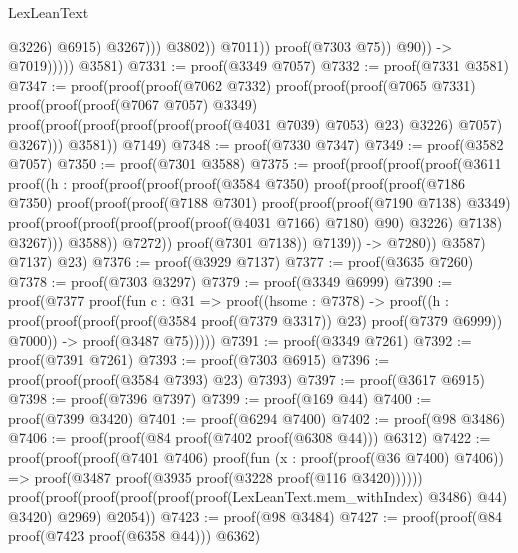 \begin{lexlean}{LexLeanText}
\begin{coremodule}
                                                @3226)
                                              @6915)
                                            @3267)))
                                  @3802))
                            @7011))
                      proof(@7303 @75))
                    @90)) ->
                @7019)))))
      @3581)
@7331 := proof(@3349 @7057)
@7332 := proof(@7331 @3581)
@7347 := proof(proof(proof(@7062 @7332)
        proof(proof(proof(@7065 @7331)
              proof(proof(proof(@7067 @7057) @3349)
                  proof(proof(proof(proof(proof(proof(@4031 @7039) @7053) @23) @3226) @7057)
                      @3267)))
            @3581))
      @7149)
@7348 := proof(@7330 @7347)
@7349 := proof(@3582 @7057)
@7350 := proof(@7301 @3588)
@7375 := proof(proof(proof(proof(@3611
            proof((h : proof(proof(proof(proof(@3584 @7350)
                      proof(proof(proof(@7186 @7350)
                            proof(proof(proof(@7188 @7301)
                                  proof(proof(proof(@7190 @7138) @3349)
                                      proof(proof(proof(proof(proof(proof(@4031 @7166) @7180) @90)
                                              @3226)
                                            @7138)
                                          @3267)))
                                @3588))
                          @7272))
                    proof(@7301 @7138))
                  @7139)) ->
              @7280))
          @3587)
        @7137)
      @23)
@7376 := proof(@3929 @7137)
@7377 := proof(@3635 @7260)
@7378 := proof(@7303 @3297)
@7379 := proof(@3349 @6999)
@7390 := proof(@7377
      proof(fun {c : @31} =>
        proof((hsome : @7378) ->
          proof((h : proof(proof(proof(proof(@3584 proof(@7379 @3317)) @23) proof(@7379 @6999))
                @7000)) ->
            proof(@3487 @75)))))
@7391 := proof(@3349 @7261)
@7392 := proof(@7391 @7261)
@7393 := proof(@7303 @6915)
@7396 := proof(proof(proof(@3584 @7393) @23) @7393)
@7397 := proof(@3617 @6915)
@7398 := proof(@7396 @7397)
@7399 := proof(@169 @44)
@7400 := proof(@7399 @3420)
@7401 := proof(@6294 @7400)
@7402 := proof(@98 @3486)
@7406 := proof(proof(@84 proof(@7402 proof(@6308 @44))) @6312)
@7422 := proof(proof(proof(@7401 @7406)
        proof(fun (x : proof(proof(@36 @7400) @7406)) =>
          proof(@3487 proof(@3935 proof(@3228 proof(@116 @3420))))))
      proof(proof(proof(proof(proof(proof(LexLeanText.mem_withIndex) @3486) @44) @3420) @2969)
          @2054))
@7423 := proof(@98 @3484)
@7427 := proof(proof(@84 proof(@7423 proof(@6358 @44))) @6362)

\end{coremodule}
\end{lexlean}
